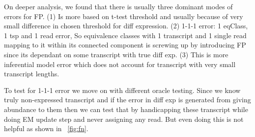 \documentclass{article}
\begin{document}
On deeper analysis, we found that there is usually three dominant modes of errors for FP. (1) Is more based on t-test threshold and usually because of very small difference in chosen threshold for diff expression. (2) 1-1-1 error: 1 eqClass, 1 tsp and 1 read error, So equivalence classes with 1 transcript and 1 single read mapping to it within its connected component is screwing up by introducing FP since its dependant on some transcript with true diff exp. (3) This is more inferential model error which does not account for transcript with very small transcript lengths.

To test for 1-1-1 error we move on with different oracle testing. Since we know truly non-expressed transcript and if the error in diff exp is generated from giving abundance to them then we can test that by handicapping these transcript while doing EM update step and never assigning any read. But even doing this is not helpful as shown in ~\cref{fig:fn}.



\end{document}
